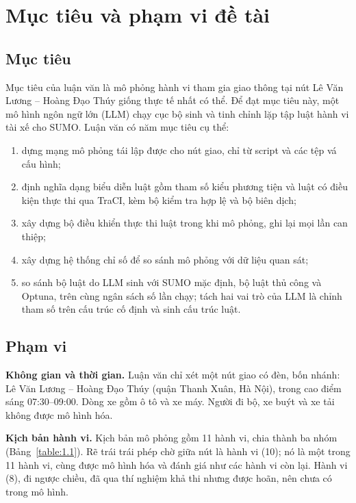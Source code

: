 \documentclass[../DoAn.tex]{subfiles}
\begin{document}
\section{Mục tiêu và phạm vi đề tài}
\label{section:1.2}

\subsection{Mục tiêu}

Mục tiêu của luận văn là mô phỏng hành vi tham gia giao thông tại nút Lê Văn Lương -- Hoàng Đạo Thúy giống thực tế nhất có thể. Để đạt mục tiêu này, một mô hình ngôn ngữ lớn (LLM) chạy cục bộ sinh và tinh chỉnh lặp tập luật hành vi tài xế cho SUMO. Luận văn có năm mục tiêu cụ thể:
\begin{enumerate}[label=(\roman*)]
    \item dựng mạng mô phỏng tái lập được cho nút giao, chỉ từ script và các tệp vá cấu hình;
    \item định nghĩa dạng biểu diễn luật gồm tham số kiểu phương tiện và luật có điều kiện thực thi qua TraCI, kèm bộ kiểm tra hợp lệ và bộ biên dịch;
    \item xây dựng bộ điều khiển thực thi luật trong khi mô phỏng, ghi lại mọi lần can thiệp;
    \item xây dựng hệ thống chỉ số để so sánh mô phỏng với dữ liệu quan sát;
    \item so sánh bộ luật do LLM sinh với SUMO mặc định, bộ luật thủ công và Optuna, trên cùng ngân sách số lần chạy; tách hai vai trò của LLM là chỉnh tham số trên cấu trúc cố định và sinh cấu trúc luật.
\end{enumerate}

\subsection{Phạm vi}

\textbf{Không gian và thời gian.} Luận văn chỉ xét một nút giao có đèn, bốn nhánh: Lê Văn Lương -- Hoàng Đạo Thúy (quận Thanh Xuân, Hà Nội), trong cao điểm sáng 07:30--09:00. Dòng xe gồm ô tô và xe máy. Người đi bộ, xe buýt và xe tải không được mô hình hóa.

\textbf{Kịch bản hành vi.} Kịch bản mô phỏng gồm 11 hành vi, chia thành ba nhóm (Bảng~\ref{table:1.1}). Rẽ trái trái phép chờ giữa nút là hành vi (10); nó là một trong 11 hành vi, cùng được mô hình hóa và đánh giá như các hành vi còn lại. Hành vi (8), đi ngược chiều, đã qua thí nghiệm khả thi nhưng được hoãn, nên chưa có trong mô hình.
\end{document}
